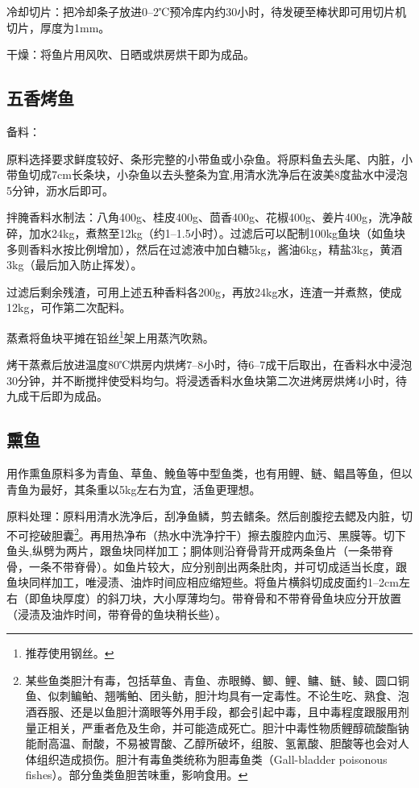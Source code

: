 \documentclass{ctexbook}
\begin{document}
冷却切片：把冷却条子放进0--2℃预冷库内约30小时，待发硬至棒状即可用切片机切片，厚度为1mm。

干燥：将鱼片用风吹、日晒或烘房烘干即为成品。

\subsection{五香烤鱼}
备料：

原料选择要求鲜度较好、条形完整的小带鱼或小杂鱼。将原料鱼去头尾、内脏，小带鱼切成7cm长条块，小杂鱼以去头整条为宜,用清水洗净后在波美8度盐水中浸泡5分钟，沥水后即可。

拌腌香料水制法：八角400g、桂皮400g、茴香400g、花椒400g、姜片400g，洗净敲碎，加水24kg，煮熬至12kg（约1--1.5小时）。过滤后可以配制100kg鱼块（如鱼块多则香料水按比例增加），然后在过滤液中加白糖5kg，酱油6kg，精盐3kg，黄酒3kg（最后加入防止挥发）。

过滤后剩余残渣，可用上述五种香料各200g，再放24kg水，连渣一并煮熬，使成12kg，可作第二次配料。

蒸煮将鱼块平摊在铅丝\footnote{推荐使用钢丝。}架上用蒸汽吹熟。

烤干蒸煮后放进温度80℃烘房内烘烤7--8小时，待6--7成干后取出，在香料水中浸泡30分钟，并不断搅拌使受料均匀。将浸透香料水鱼块第二次进烤房烘烤4小时，待九成干后即为成品。
\subsection{熏鱼}
用作熏鱼原料多为青鱼、草鱼、鮸鱼等中型鱼类，也有用鲤、鲢、鲳昌等鱼，但以青鱼为最好，其条重以5kg左右为宜，活鱼更理想。

原料处理：原料用清水洗净后，刮净鱼鳞，剪去鳍条。然后剖腹挖去鳃及内脏，切不可挖破胆囊\footnote{某些鱼类胆汁有毒，包括草鱼、青鱼、赤眼鳟、鲫、鲤、鳙、鲢、鲮、圆口铜鱼、似刺鳊鲌、翘嘴鲌、团头鲂，胆汁均具有一定毒性。不论生吃、熟食、泡酒吞服、还是以鱼胆汁滴眼等外用手段，都会引起中毒，且中毒程度跟服用剂量正相关，严重者危及生命，并可能造成死亡。胆汁中毒性物质鲤醇硫酸酯钠能耐高温、耐酸，不易被胃酸、乙醇所破坏，组胺、氢氰酸、胆酸等也会对人体组织造成损伤。胆汁有毒鱼类统称为胆毒鱼类（Gall-bladder poisonous fishes）。部分鱼类鱼胆苦味重，影响食用。}。再用热净布（热水中洗净拧干）擦去腹腔内血污、黑膜等。切下鱼头,纵劈为两片，跟鱼块同样加工；胴体则沿脊骨背开成两条鱼片（一条带脊骨，一条不带脊骨）。如鱼片较大，应分别剖出两条肚肉，并可切成适当长度，跟鱼块同样加工，唯浸渍、油炸时间应相应缩短些。将鱼片横斜切成皮面约1--2cm左右（即鱼块厚度）的斜刀块，大小厚薄均匀。带脊骨和不带脊骨鱼块应分开放置（浸渍及油炸时间，带脊骨的鱼块稍长些）。
\end{document}
